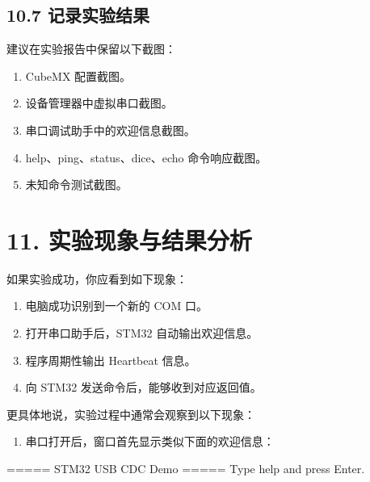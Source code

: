 \documentclass[
  chinese,
  UTF8,
  oneside,
  openany]{ctexbook}
\newenvironment{Shaded}{}{}
\newcommand{\NormalTok}[1]{#1}
\providecommand{\tightlist}{%
  \setlength{\itemsep}{0pt}\setlength{\parskip}{0pt}}
\begin{document}
\subsection{10.7
记录实验结果}\label{ux8bb0ux5f55ux5b9eux9a8cux7ed3ux679c}

建议在实验报告中保留以下截图：

\begin{enumerate}
\def\labelenumi{\arabic{enumi}.}
\tightlist
\item
  CubeMX 配置截图。
\item
  设备管理器中虚拟串口截图。
\item
  串口调试助手中的欢迎信息截图。
\item
  help、ping、status、dice、echo 命令响应截图。
\item
  未知命令测试截图。
\end{enumerate}

\section{11.
实验现象与结果分析}\label{ux5b9eux9a8cux73b0ux8c61ux4e0eux7ed3ux679cux5206ux6790}

如果实验成功，你应看到如下现象：

\begin{enumerate}
\def\labelenumi{\arabic{enumi}.}
\tightlist
\item
  电脑成功识别到一个新的 COM 口。
\item
  打开串口助手后，STM32 自动输出欢迎信息。
\item
  程序周期性输出 Heartbeat 信息。
\item
  向 STM32 发送命令后，能够收到对应返回值。
\end{enumerate}

更具体地说，实验过程中通常会观察到以下现象：

\begin{enumerate}
\def\labelenumi{\arabic{enumi}.}
\tightlist
\item
  串口打开后，窗口首先显示类似下面的欢迎信息：
\end{enumerate}

\begin{Shaded}
\begin{Highlighting}[]
\NormalTok{===== STM32 USB CDC Demo =====}
\NormalTok{Type \textquotesingle{}help\textquotesingle{} and press Enter.}
\end{Highlighting}
\end{Shaded}
\end{document}
